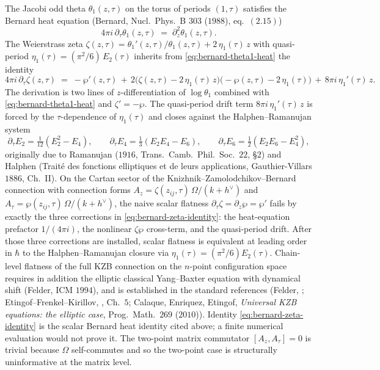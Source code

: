 \begin{remark}
\label{rem:bernard-heat-identity-zeta}
\ClaimStatusProvedElsewhere
The Jacobi odd theta $\theta_1(z, \tau)$ on the torus of
periods $(1, \tau)$ satisfies the Bernard heat equation
\textup{(}Bernard, Nucl.\ Phys.\ B $303$ ($1988$),
eq.~$(2.15)$\textup{)}
\begin{equation}
\label{eq:bernard-theta1-heat}
4\pi i\,\partial_\tau \theta_1(z, \tau)
\;=\; \partial_z^2 \theta_1(z, \tau).
\end{equation}
The Weierstrass zeta $\zeta(z, \tau) = \theta_1'(z,\tau)/
\theta_1(z, \tau) + 2\,\eta_1(\tau)\, z$ with quasi-period
$\eta_1(\tau) = (\pi^2/6)\,E_2(\tau)$ inherits from
\eqref{eq:bernard-theta1-heat} the identity
\begin{equation}
\label{eq:bernard-zeta-identity}
4\pi i\,\partial_\tau \zeta(z, \tau)
\;=\; -\wp'(z, \tau)
\,+\, 2\bigl(\zeta(z,\tau) - 2\,\eta_1(\tau)\, z\bigr)
\bigl({-}\wp(z, \tau) - 2\,\eta_1(\tau)\bigr)
\,+\, 8\pi i\,\eta_1'(\tau)\, z.
\end{equation}
The derivation is two lines of $z$-differentiation of
$\log \theta_1$ combined with \eqref{eq:bernard-theta1-heat}
and $\zeta' = -\wp$. The quasi-period drift term
$8\pi i\,\eta_1'(\tau)\, z$ is forced by the $\tau$-dependence
of $\eta_1(\tau)$ and closes against the Halphen--Ramanujan
system
\[
\partial_\tau E_2 = \tfrac{1}{12}(E_2^2 - E_4), \qquad
\partial_\tau E_4 = \tfrac{1}{3}(E_2 E_4 - E_6), \qquad
\partial_\tau E_6 = \tfrac{1}{2}(E_2 E_6 - E_4^2),
\]
originally due to Ramanujan \textup{(}$1916$, Trans.\ Camb.\
Phil.\ Soc.\ $22$, \S $2$\textup{)} and Halphen
\textup{(}Trait\'e des fonctions elliptiques et de leurs
applications, Gauthier-Villars $1886$, Ch.~II\textup{)}.
On the Cartan sector of the
Knizhnik--Zamolodchikov--Bernard connection with connection
forms $A_z = \zeta(z_{ij}, \tau)\,\Omega / (k + h^\vee)$ and
$A_\tau = \wp(z_{ij}, \tau)\,\Omega / (k + h^\vee)$, the
naive scalar flatness $\partial_\tau \zeta = \partial_z \wp
= \wp'$ fails by exactly the three corrections in
\eqref{eq:bernard-zeta-identity}: the heat-equation
prefactor $1/(4\pi i)$, the nonlinear $\zeta\wp$ cross-term,
and the quasi-period drift. After those three corrections
are installed, scalar flatness is equivalent at leading order
in $\hbar$ to the Halphen--Ramanujan closure via
$\eta_1(\tau) = (\pi^2/6) E_2(\tau)$. Chain-level flatness of
the full KZB connection on the $n$-point configuration space
requires in addition the elliptic classical Yang--Baxter
equation with dynamical shift \textup{(}Felder, ICM
$1994$\textup{)}, and is established in the standard references
\textup{(}Felder, \cite{Felder94}; Etingof--Frenkel--Kirillov,
\cite{EFK98}, Ch.~$5$; Calaque, Enriquez, Etingof,
\emph{Universal KZB equations: the elliptic case},
Prog.\ Math.\ $269$ \textup{(}$2010$\textup{)}\textup{)}.
Identity \eqref{eq:bernard-zeta-identity} is the scalar Bernard heat
identity cited above; a finite numerical evaluation would not prove
it.  The two-point
matrix commutator $[A_z, A_\tau] = 0$ is trivial because
$\Omega$ self-commutes and so the two-point case is
structurally uninformative at the matrix level.
\end{remark}

